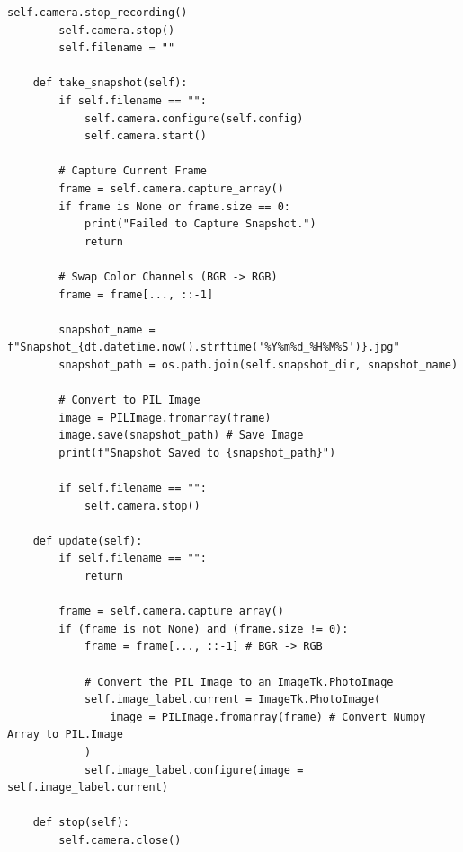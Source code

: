 \documentclass{article}
\begin{document}
\begin{lstlisting}[caption={PiCamera Display}, label={lst:picamera_display_code}]
        self.camera.stop_recording()
        self.camera.stop()
        self.filename = ""

    def take_snapshot(self):
        if self.filename == "":
            self.camera.configure(self.config)
            self.camera.start()

        # Capture Current Frame
        frame = self.camera.capture_array()
        if frame is None or frame.size == 0:
            print("Failed to Capture Snapshot.")
            return

        # Swap Color Channels (BGR -> RGB)
        frame = frame[..., ::-1]

        snapshot_name = f"Snapshot_{dt.datetime.now().strftime('%Y%m%d_%H%M%S')}.jpg"
        snapshot_path = os.path.join(self.snapshot_dir, snapshot_name)

        # Convert to PIL Image
        image = PILImage.fromarray(frame)
        image.save(snapshot_path) # Save Image
        print(f"Snapshot Saved to {snapshot_path}")

        if self.filename == "":
            self.camera.stop()

    def update(self):
        if self.filename == "":
            return

        frame = self.camera.capture_array()
        if (frame is not None) and (frame.size != 0):
            frame = frame[..., ::-1] # BGR -> RGB

            # Convert the PIL Image to an ImageTk.PhotoImage
            self.image_label.current = ImageTk.PhotoImage(
                image = PILImage.fromarray(frame) # Convert Numpy Array to PIL.Image
            )
            self.image_label.configure(image = self.image_label.current)

    def stop(self):
        self.camera.close()
\end{lstlisting}
\end{document}
